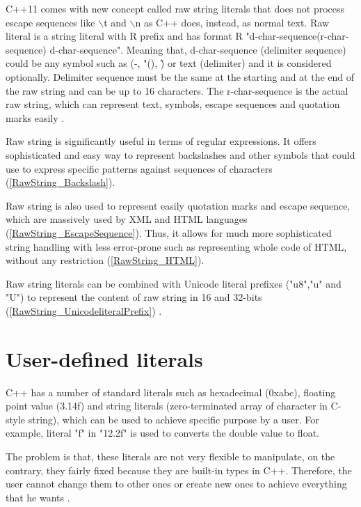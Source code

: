 \documentclass[11pt]{report}
\begin{document}
C++11 comes with new concept called raw string literals that does not process escape sequences like $\backslash$t and $\backslash$n as C++ does, instead, as normal text. Raw literal is a string literal with R prefix and has format R "d-char-sequence(r-char-sequence) d-char-sequence". Meaning that, d-char-sequence (delimiter sequence) could be any symbol such as (-, "(), \~) or text (delimiter) and it is considered optionally. Delimiter sequence must be the same at the starting and at the end of the raw string and can be up to 16 characters. The r-char-sequence is the actual raw string, which can represent text, symbols, escape sequences and quotation marks easily \cite{Gregorie:professionalcpp}.


Raw string is significantly useful in terms of regular expressions. It offers sophisticated and easy way to represent backslashes and other symbols that could use to express specific patterns against sequences of characters (\ref{RawString_Backslash}).


Raw string is also used to represent easily quotation marks and escape sequence, which are massively used by XML and HTML languages (\ref{RawString_EscapeSequence}). Thus, it allows for much more sophisticated string handling with less error-prone such as representing whole code of HTML, without any restriction (\ref{RawString_HTML}).

Raw string literals can be combined with Unicode literal prefixes  ("u8","u" and "U") to represent the content of raw string in 16 and 32-bits (\ref{RawString_UnicodeliteralPrefix}) \cite{Gregorie:professionalcpp}.

\section{User-defined literals}
\label{section: User-defined literals}
C++ has a number of standard literals such as hexadecimal (0xabc), floating point value (3.14f) and string literals (zero-terminated array of character in C-style string), which can be used to achieve specific purpose by a user. For example, literal "f" in "12.2f" is used to converts the double value to float. 


The problem is that, these literals are not very flexible to manipulate, on the contrary, they fairly fixed because they are built-in types in C++. Therefore, the user cannot change them to other ones or create new ones to achieve everything that he wants \cite{Overland:2011:CWF}.
\end{document}
